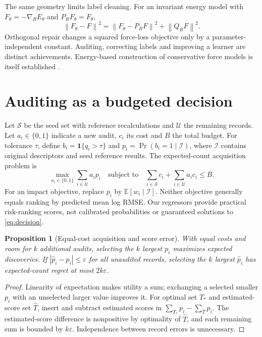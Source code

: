 \documentclass[11pt]{article}
\newtheorem{proposition}{Proposition}
\newcommand{\E}{\mathbb{E}}
\newcommand{\norm}[1]{\left\lVert #1\right\rVert}
\begin{document}
The same geometry limits label cleaning. For an invariant energy model with
$F_\theta=-\nabla_RE_\theta$ and $P_RF_\theta=F_\theta$,
\begin{equation}\label{eq:noop}
 \norm{F_\theta-F}^2=\norm{F_\theta-P_RF}^2+\norm{Q_RF}^2.
\end{equation}
Orthogonal repair changes a squared force-loss objective only by a
parameter-independent constant. Auditing, correcting labels and improving a
learner are distinct achievements. Energy-based construction of conservative
force models is itself established \citep{chmiela2017}.

\section{Auditing as a budgeted decision}
Let $\mathcal S$ be the seed set with reference recalculations and $\mathcal U$
the remaining records. Let $a_i\in\{0,1\}$ indicate a new audit, $c_i$ its cost
and $B$ the total budget. For tolerance $\tau$, define
$b_i=\mathbf1\{q_i>\tau\}$ and $p_i=\Pr(b_i=1\mid\mathcal I)$, where $\mathcal I$
contains original descriptors and seed reference results. The expected-count
acquisition problem is
\begin{equation}\label{eq:decision}
 \max_{a_i\in\{0,1\}}\sum_{i\in\mathcal U}a_ip_i
 \quad\text{subject to}\quad
 \sum_{i\in\mathcal S}c_i+\sum_{i\in\mathcal U}a_ic_i\le B.
\end{equation}
For an impact objective, replace $p_i$ by $\E[w_i\mid\mathcal I]$. Neither
objective generally equals ranking by predicted mean log RMSE. Our regressors
provide practical risk-ranking scores, not calibrated probabilities or guaranteed
solutions to \eqref{eq:decision}.

\begin{proposition}[Equal-cost acquisition and score error]
With equal costs and room for $k$ additional audits, selecting the $k$ largest
$p_i$ maximizes expected discoveries. If $|\widehat p_i-p_i|\le\varepsilon$ for
all unaudited records, selecting the $k$ largest $\widehat p_i$ has expected-count
regret at most $2k\varepsilon$.
\end{proposition}
\begin{proof}
Linearity of expectation makes utility a sum; exchanging a selected smaller
$p_i$ with an unselected larger value improves it. For optimal set $T_*$ and
estimated-score set $\widehat T$, insert and subtract estimated scores in
$\sum_{T_*}p_i-\sum_{\widehat T}p_i$. The estimated-score difference is nonpositive
by optimality of $\widehat T$, and each remaining sum is bounded by
$k\varepsilon$. Independence between record errors is unnecessary.
\end{proof}
\end{document}
